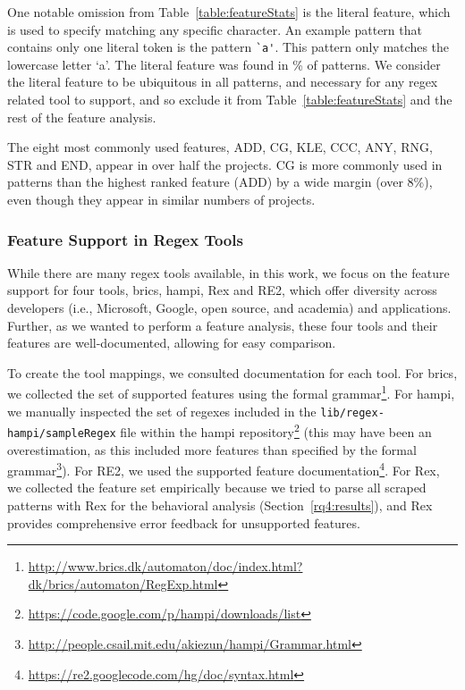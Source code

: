 One notable omission from Table~\ref{table:featureStats} is the literal feature, which is used  to specify matching any specific character.  An example pattern that contains only one literal token is the pattern \verb!`a'!.  This pattern only matches the lowercase letter `a'.  The literal feature was found in \% of patterns.
We consider the literal feature to be ubiquitous in all patterns, and necessary for any regex related tool to support, and so exclude it from Table~\ref{table:featureStats} and the rest of the feature analysis.



The eight most commonly used features, ADD, CG, KLE, CCC, ANY, RNG, STR and END,
appear in over half the projects. %
CG is more commonly used in patterns than the highest ranked feature (ADD) by a wide margin (over 8\%), even though they appear in similar numbers of projects.

\subsubsection{Feature Support in Regex Tools}
\label{regextoolsresults}
While there are many regex tools available, in this work, we focus on the feature support for  four tools, brics, hampi, Rex and RE2, which offer diversity across developers (i.e., Microsoft, Google, open source, and academia) and applications. Further, as we wanted to perform a feature analysis, these four tools and their features are well-documented, allowing for easy comparison.

To create the tool mappings, we consulted documentation for each tool. For brics, we collected the set of supported features using the formal grammar\footnote{\url{http://www.brics.dk/automaton/doc/index.html?dk/brics/automaton/RegExp.html}}.  For hampi, we manually inspected the set of regexes included in the {\tt lib/regex-hampi/sampleRegex} file within the hampi repository\footnote{\url{https://code.google.com/p/hampi/downloads/list}} (this may have been an overestimation, as this included more features than specified by the formal grammar\footnote{\url{http://people.csail.mit.edu/akiezun/hampi/Grammar.html}}).  For RE2, we used the  supported feature documentation\footnote{\url{https://re2.googlecode.com/hg/doc/syntax.html}}.  For Rex, we collected the feature set empirically because we tried to parse all scraped patterns with Rex for the behavioral analysis (Section~\ref{rq4:results}), and Rex provides comprehensive error feedback for unsupported features.

